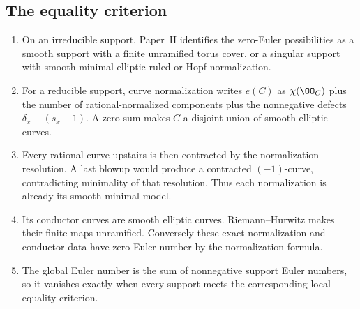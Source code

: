 \subsection*{The equality criterion}
\RungOne
\begin{enumerate}[label=\arabic*.,leftmargin=*]
\item On an irreducible support, Paper~II identifies the
zero-Euler possibilities as a smooth support with a finite
unramified torus cover, or a singular support with smooth
minimal elliptic ruled or Hopf normalization.
\item For a reducible support, curve normalization writes
$e(C)$ as $\chi(\OO_C)$ plus the number of rational-normalized
components plus the nonnegative defects
$\delta_x-(s_x-1)$.  A zero sum makes $C$ a disjoint union
of smooth elliptic curves.
\item Every rational curve upstairs is then contracted by
the normalization resolution.  A last blowup would produce
a contracted $(-1)$-curve, contradicting minimality of
that resolution.  Thus each normalization is already its
smooth minimal model.
\item Its conductor curves are smooth elliptic curves.
Riemann--Hurwitz makes their finite maps unramified.
Conversely these exact normalization and conductor data
have zero Euler number by the normalization formula.
\item The global Euler number is the sum of nonnegative
support Euler numbers, so it vanishes exactly when every
support meets the corresponding local equality criterion.
\end{enumerate}

